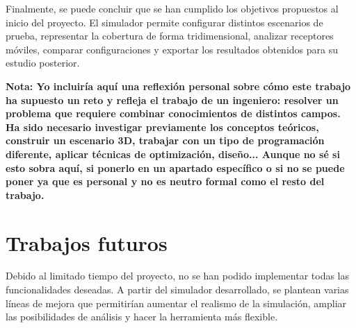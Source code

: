 Finalmente, se puede concluir que se han cumplido los objetivos propuestos al inicio del proyecto. El simulador permite configurar distintos escenarios de prueba, representar la cobertura de forma tridimensional, analizar receptores móviles, comparar configuraciones y exportar los resultados obtenidos para su estudio posterior.

\par\medskip
    \textbf{Nota: Yo incluiría aquí una reflexión personal sobre cómo este trabajo ha supuesto un reto y refleja el trabajo de un ingeniero: resolver un problema que requiere combinar conocimientos de distintos campos. Ha sido necesario investigar previamente los conceptos teóricos, construir un escenario 3D, trabajar con un tipo de programación diferente, aplicar técnicas de optimización, diseño... Aunque no sé si esto sobra aquí, si ponerlo en un apartado específico o si no se puede poner ya que es personal y no es neutro formal como el resto del trabajo.}
\par\medskip

\section{Trabajos futuros}

Debido al limitado tiempo del proyecto, no se han podido implementar todas las funcionalidades deseadas. A partir del simulador desarrollado, se plantean varias líneas de mejora que permitirían aumentar el realismo de la simulación, ampliar las posibilidades de análisis y hacer la herramienta más flexible.

